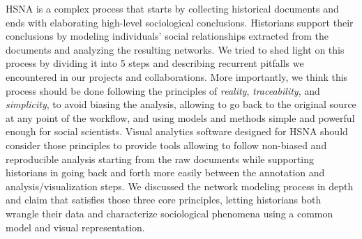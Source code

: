 HSNA is a complex process that starts by collecting historical documents and ends with elaborating high-level sociological conclusions.
Historians support their conclusions by modeling individuals' social relationships extracted from the documents and analyzing the resulting networks.
We tried to shed light on this process by dividing it into 5 steps and describing recurrent pitfalls we encountered in our projects and collaborations.
More importantly, we think this process should be done following the principles of \textit{reality}, \textit{traceability}, and \textit{simplicity}, to avoid biasing the analysis, allowing to go back to the original source at any point of the workflow, and using models and methods simple and powerful enough for social scientists.
Visual analytics software designed for HSNA should consider those principles to provide tools allowing to follow non-biased and reproducible analysis starting from the raw documents while supporting historians in going back and forth more easily between the annotation and analysis/visualization steps.
We discussed the network modeling process in depth and claim that \modelplural satisfies those three core principles, letting historians both wrangle their data and characterize sociological phenomena using a common model and visual representation.